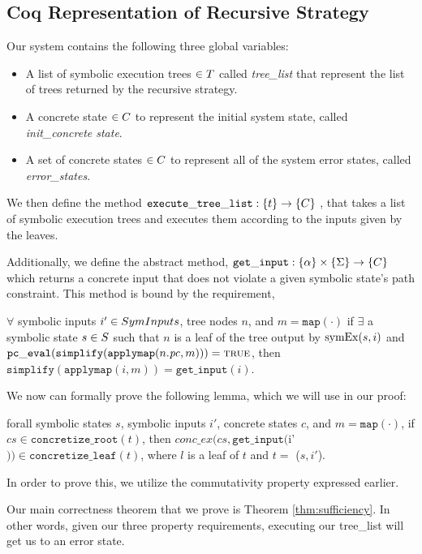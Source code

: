 \subsection{Coq Representation of Recursive Strategy}
Our system contains the following three global variables:
\begin{itemize}
\item A list of symbolic execution trees $\in T$ called \textit{tree\_list} that represent the list of trees returned by the recursive strategy.
\item A concrete state $\in C$ to represent the initial system state, called \textit{init\_concrete state}.
\item A set of concrete states $\in C$ to represent all of the system error states, called \textit{error\_states}.
\end{itemize}

We then define the method $ \mathtt{execute\_tree\_list} : \{t\} \rightarrow \{C\}$ , that takes a list of symbolic execution trees and executes them according to the inputs given by the leaves.

Additionally, we define the abstract method, $ \mathtt{get\_input} : \{\alpha\} \times \{\Sigma\} \rightarrow \{C\}$ which returns a concrete input that does not violate a given symbolic state's path constraint.
This method is bound by the requirement,

\begin{definition}
$ \forall$ symbolic inputs $i' \in SymInputs$, tree nodes $n$, and $m = \mathtt{map(\cdot)}$
if $\exists$ a symbolic state $s \in S$  such that
$n$ is a leaf of the tree output by $\mathrm{symEx}(s, i)$ and 
$\mathtt{pc\_eval} (\mathtt{simplify}(\mathtt{applymap} (n.\mathit{pc}, m))) = \mathtt{\textsc{true}}$, then
$\mathtt{simplify}(\mathtt{applymap} (i, m)) = \mathtt{get\_input}(i)$.
\end{definition}



We now can formally prove the following lemma, which we will use in our proof:
\begin{lemma} \label{cop}
forall symbolic states $s$, symbolic inputs $i'$, concrete states $c$, and $m = \mathtt{map(\cdot)}$,
if $cs \in \mathtt{concretize\_root}(t)$,
then 
$conc\_ex(cs, \mathtt{get\_input} ($i'$)) \in \mathtt{concretize\_leaf}(t)$,
where $l$ is a leaf of $t$ and $t = $ \symexecution($s, i'$).
\end{lemma}

In order to prove this, we utilize the commutativity property expressed earlier.





Our main correctness theorem that we prove is Theorem \ref{thm:sufficiency}. In other words, given our three property requirements, executing our tree\_list will get us to an error state.
